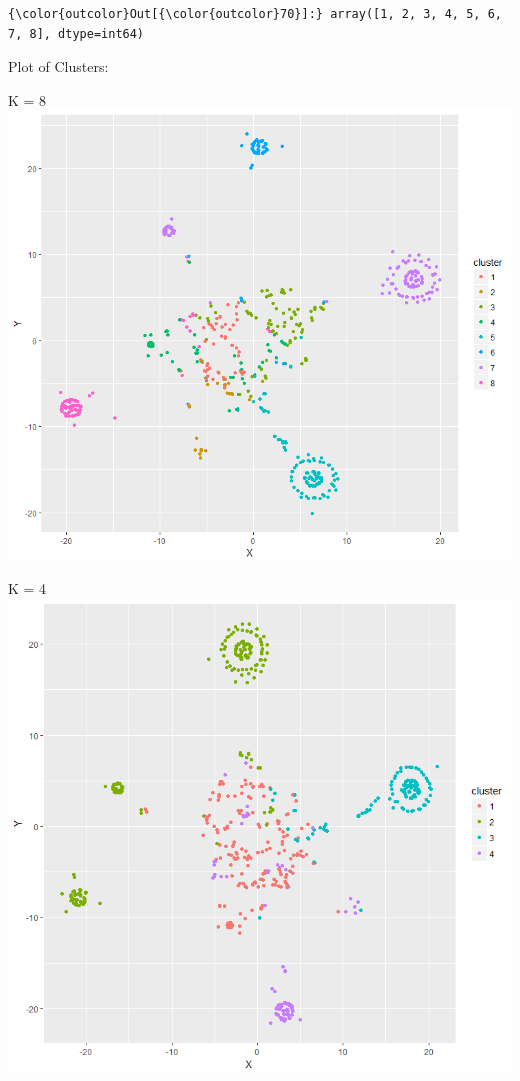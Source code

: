 \documentclass[11pt]{article}
\makeatletter
\def\maxwidth{\ifdim\Gin@nat@width>\linewidth\linewidth
    \else\Gin@nat@width\fi}
\let\Oldincludegraphics\includegraphics
\renewcommand{\includegraphics}[1]{\Oldincludegraphics[width=.8\maxwidth]{#1}}
\makeatother
\begin{document}
\begin{Verbatim}[commandchars=\\\{\}]
{\color{outcolor}Out[{\color{outcolor}70}]:} array([1, 2, 3, 4, 5, 6, 7, 8], dtype=int64)
\end{Verbatim}
            
    Plot of Clusters:

    K = 8 \includegraphics{PlotStruct0518.png}

    K = 4 \includegraphics{plotStruct40518.png}
\end{document}
